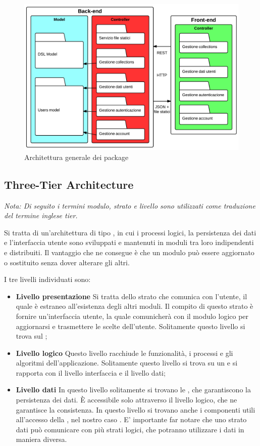 \begin{figure}[H]
\centering
\includegraphics[width=\textwidth]{architettura-generale-package.png}
\caption{Architettura generale dei package}
\label{architetturaGeneralePackage}
\end{figure}

\subsection{Three-Tier Architecture}

\emph{Nota: Di seguito i termini modulo, strato e livello sono utilizzati come traduzione del termine inglese tier.}
 
Si tratta di un'architettura di tipo , in cui i processi logici, la persistenza dei dati e l'interfaccia utente sono sviluppati e mantenuti in moduli tra loro indipendenti e distribuiti. Il vantaggio che ne consegue è che un modulo può essere aggiornato o sostituito senza dover alterare gli altri.

I tre livelli individuati sono:
\begin{itemize}
\item \textbf{Livello presentazione} Si tratta dello strato che comunica con l'utente, il quale è estraneo all'esistenza degli altri moduli. Il compito di questo strato è fornire un'interfaccia utente, la quale comunicherà con il modulo logico per aggiornarsi e trasmettere le scelte dell'utente. Solitamente questo livello si trova sul ;
\item \textbf{Livello logico} Questo livello racchiude le funzionalità, i processi e gli algoritmi dell'applicazione. Solitamente questo livello si trova su un  e si rapporta con il livello interfaccia e il livello dati; 
\item \textbf{Livello dati} In questo livello solitamente si trovano le , che garantiscono la persistenza dei dati. È accessibile solo attraverso il livello logico, che ne garantisce la consistenza. In questo livello si trovano anche i componenti utili all'accesso della , nel nostro caso .
E' importante far notare che uno strato dati può comunicare con più strati logici, che potranno utilizzare i dati in maniera diversa.
\end{itemize}

